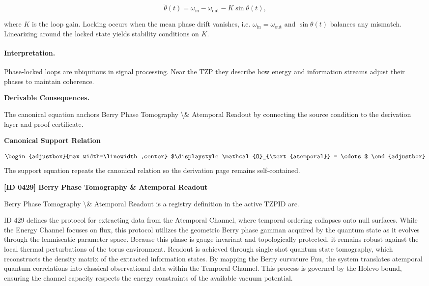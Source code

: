 \begin{equation}
\dot{\theta}(t) = \omega_{\mathrm{in}} - \omega_{\mathrm{out}} - K\sin\theta(t),
\end{equation}

where $K$ is the loop gain.  Locking occurs when the mean phase drift vanishes, i.e. $\omega_{\mathrm{in}} = \omega_{\mathrm{out}}$ and $\sin\theta(t)$ balances any mismatch.
Linearizing around the locked state yields stability conditions on $K$.

\paragraph{Interpretation.}

Phase‑locked loops are ubiquitous in signal processing.  Near the TZP they describe how energy and information streams adjust their phases to maintain coherence.

\par\vspace{0.35em}
\noindent\textbf{Derivable Consequences.}\quad
\begingroup
\footnotesize
\raggedright
The canonical equation anchors Berry Phase Tomography \textbackslash{}\& Atemporal Readout by connecting the source condition to the derivation layer and proof certificate.
\par\endgroup

\noindent\textbf{Canonical Support Relation}\par
\[
\begin{adjustbox}{max width=\linewidth,center}
$\displaystyle
\mathcal{O}_{\text{atemporal}} = \cdots
$
\end{adjustbox}
\]
\noindent The support equation repeats the canonical relation so the derivation page remains self-contained.\par

\clearpage
\noindent\textbf{[ID 0429] Berry Phase Tomography \& Atemporal Readout}\par
\vspace{0.35em}
\begingroup\small
{}
Berry Phase Tomography \textbackslash{}\& Atemporal Readout is a registry definition in the active TZPID arc.

ID 429 defines the protocol for extracting data from the Atemporal Channel, where temporal ordering collapses onto null surfaces. While the Energy Channel focuses on flux, this protocol utilizes the geometric Berry phase gamman acquired by the quantum state as it evolves through the lemniscatic parameter space. Because this phase is gauge invariant and topologically protected, it remains robust against the local thermal perturbations of the torus environment. Readout is achieved through single shot quantum state tomography, which reconstructs the density matrix of the extracted information states. By mapping the Berry curvature Fnu, the system translates atemporal quantum correlations into classical observational data within the Temporal Channel. This process is governed by the Holevo bound, ensuring the channel capacity respects the energy constraints of the available vacuum potential.

